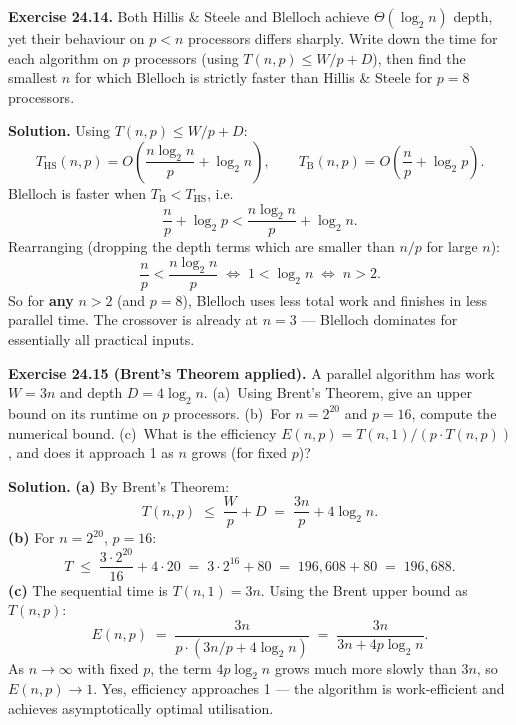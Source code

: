 \begin{ppexercises}
\textbf{Exercise 24.14.} Both Hillis \& Steele and Blelloch achieve
$\Theta(\log_2 n)$ depth, yet their behaviour on $p < n$ processors
differs sharply. Write down the time for each algorithm on $p$
processors (using $T(n,p) \le W/p + D$), then find the smallest $n$
for which Blelloch is strictly faster than Hillis \& Steele for
$p = 8$ processors.

\medskip
\textbf{Solution.}
Using $T(n,p) \le W/p + D$:
\[
T_{\mathrm{HS}}(n,p) = O\!\left(\frac{n\log_2 n}{p}+\log_2 n\right),
\qquad
T_{\mathrm{B}}(n,p)  = O\!\left(\frac{n}{p}+\log_2 p\right).
\]
Blelloch is faster when $T_{\mathrm{B}} < T_{\mathrm{HS}}$, i.e.\
\[
\frac{n}{p}+\log_2 p < \frac{n\log_2 n}{p}+\log_2 n.
\]
Rearranging (dropping the depth terms which are smaller than $n/p$
for large $n$):
\[
\frac{n}{p} < \frac{n\log_2 n}{p}
\;\Longleftrightarrow\; 1 < \log_2 n
\;\Longleftrightarrow\; n > 2.
\]
So for \textbf{any} $n > 2$ (and $p = 8$), Blelloch uses less total
work and finishes in less parallel time. The crossover is already at
$n = 3$ --- Blelloch dominates for essentially all practical inputs.
\end{ppexercises}


\begin{ppexercises}
\textbf{Exercise 24.15 (Brent's Theorem applied).}
A parallel algorithm has work $W = 3n$ and depth $D = 4\log_2 n$.
(a)~Using Brent's Theorem, give an upper bound on its runtime on $p$
processors. (b)~For $n = 2^{20}$ and $p = 16$, compute the numerical
bound. (c)~What is the efficiency $E(n,p) = T(n,1) / (p \cdot T(n,p))$,
and does it approach 1 as $n$ grows (for fixed $p$)?

\medskip
\textbf{Solution.}
\textbf{(a)} By Brent's Theorem:
\[
T(n,p) \;\le\; \frac{W}{p} + D \;=\; \frac{3n}{p} + 4\log_2 n.
\]
\textbf{(b)} For $n = 2^{20}$, $p = 16$:
\[
T \;\le\; \frac{3 \cdot 2^{20}}{16} + 4 \cdot 20 \;=\; 3 \cdot 2^{16} + 80
\;=\; 196{,}608 + 80 \;=\; 196{,}688.
\]
\textbf{(c)} The sequential time is $T(n,1) = 3n$. Using the Brent upper
bound as $T(n,p)$:
\[
E(n,p) \;=\; \frac{3n}{p \cdot (3n/p + 4\log_2 n)}
\;=\; \frac{3n}{3n + 4p\log_2 n}.
\]
As $n \to \infty$ with fixed $p$, the term $4p\log_2 n$ grows much more
slowly than $3n$, so $E(n,p) \to 1$. Yes, efficiency approaches 1 ---
the algorithm is work-efficient and achieves asymptotically optimal
utilisation.
\end{ppexercises}

